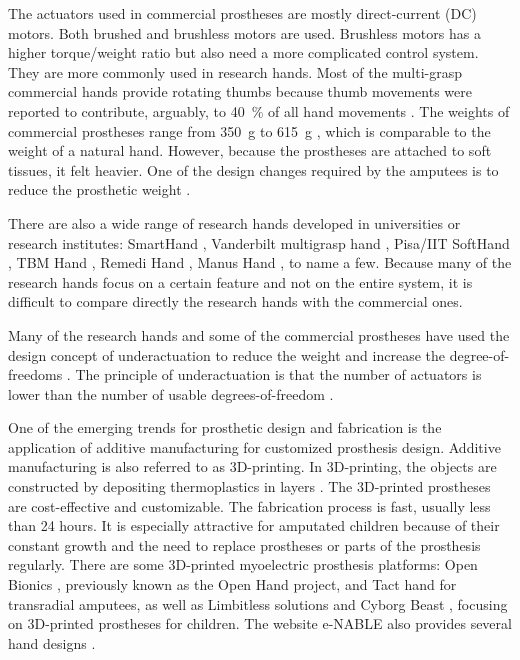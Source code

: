 The actuators used in commercial prostheses are mostly direct-current (DC) motors. Both brushed and brushless motors are used. Brushless motors has a higher torque/weight ratio but also need a more complicated control system. They are more commonly used in research hands. 
Most of the multi-grasp commercial hands provide rotating thumbs because thumb movements were reported to contribute, arguably, to \SI{40}{\%} of all hand movements \cite{michael2004atlas}.  The weights of commercial prostheses range from \SI{350}{g} to \SI{615}{g} \cite{belter2013mechanical}, which is comparable to the weight of a natural hand. %
However, because the prostheses are attached to soft tissues, it felt heavier.  One of the design changes required by the amputees is to reduce the prosthetic weight \cite{cordella2016literature}.

 
There are also a wide range of research hands developed in universities or research institutes: SmartHand \cite{carrozza2006design}, Vanderbilt multigrasp hand \cite{dalley2010multigrasp}, Pisa/IIT SoftHand \cite{catalano2014adaptive}, TBM Hand \cite{dechev2001multiple}, Remedi Hand \cite{light2000development}, Manus Hand \cite{pons2004manus}, to name a few. Because many of the research hands focus on a certain feature and not on the entire system, it is difficult to compare directly the research hands with the commercial ones. 

Many of the research hands and some of the commercial prostheses have used the design concept of underactuation to reduce the weight and increase the degree-of-freedoms \cite{belter2013mechanical}. The principle of underactuation is that the number of actuators is lower than the number of usable degrees-of-freedom \cite{kyberd2011use}.


One of the emerging trends for prosthetic design and fabrication is the application of additive manufacturing for customized prosthesis design. Additive manufacturing is also referred to as 3D-printing. In 3D-printing, the objects are constructed by depositing thermoplastics in layers \cite{ventola2014medical}.  
The 3D-printed prostheses are cost-effective and customizable. The fabrication process is fast, usually less than 24 hours. It is especially attractive for amputated children because of their constant growth and the need to replace prostheses or parts of the prosthesis regularly. 
There are some 3D-printed myoelectric prosthesis platforms: Open Bionics \cite{open_bionics}, previously known as the Open Hand project, and Tact hand \cite{slade2015tact} for transradial amputees,  as well as Limbitless solutions \cite{limbitless_solutions} and Cyborg Beast \cite{zuniga2015cyborg}, focusing on 3D-printed prostheses for children. The website e-NABLE also provides several hand designs \cite{enabling_the_future}.

